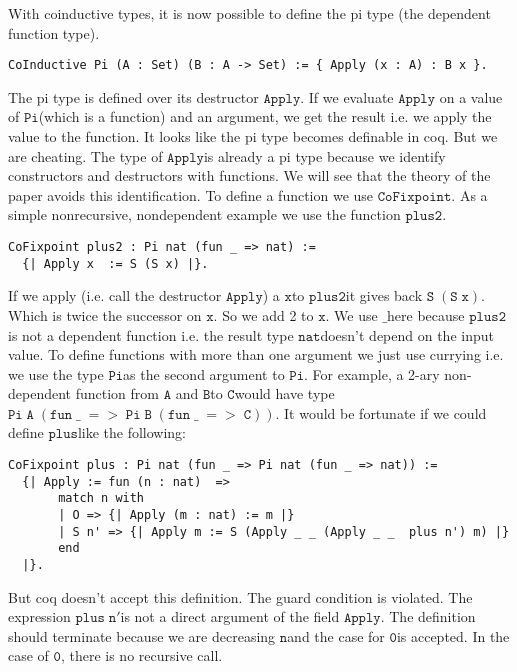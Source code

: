 \documentclass[a4paper,cleardoubleempty,BCOR1cm]{scrbook}
\begin{document}
With coinductive types, it is now possible to define the pi type (the dependent
function type).

\begin{verbatim}
CoInductive Pi (A : Set) (B : A -> Set) := { Apply (x : A) : B x }.
\end{verbatim}

The pi type is defined over its destructor $\mathtt{Apply}$.  If we evaluate $\mathtt{Apply}$
on a value of $\mathtt{Pi}$\;(which is a function) and an argument, we get the result
i.e. we apply the value to the function.  It looks like the pi type becomes definable
in coq.  But we are cheating.  The type of $\mathtt{Apply}$\;is already a pi type because
we identify constructors and destructors with functions.  We will see that the theory of
the paper avoids this identification. To define a function we use
$\mathtt{CoFixpoint}$.  As a simple nonrecursive, nondependent example we use the
function $\mathtt{plus2}$.

\begin{verbatim}
CoFixpoint plus2 : Pi nat (fun _ => nat) :=
  {| Apply x  := S (S x) |}.
\end{verbatim}

If we apply (i.e. call the destructor $\mathtt{Apply}$) a $\mathtt{x}$\;to $\mathtt{plus2}$\;it gives back
$\mathtt{S\;(S\;x)}$.  Which is twice the successor on $\mathtt{x}$.  So we add 2 to $\mathtt{x}$.  We
use $\mathtt{\_}$\;here because $\mathtt{plus2}$\;is not a dependent function i.e. the result
type $\mathtt{nat}$\;doesn't depend on the input value.  To define functions with more
than one argument we just use currying i.e. we use the type $\mathtt{Pi}$\;as the
second argument to $\mathtt{Pi}$. For example, a 2-ary non-dependent function from $\mathtt{A}$
and $\mathtt{B}$\;to $\mathtt{C}$\;would have type $\mathtt{Pi\;A\;(fun\;\_\;=>\;Pi\;B\;(fun\;\_\;=>\;C))}$.  It
would be fortunate if we could define $\mathtt{plus}$\;like the following:

\begin{verbatim}
CoFixpoint plus : Pi nat (fun _ => Pi nat (fun _ => nat)) :=
  {| Apply := fun (n : nat)  =>
       match n with
       | O => {| Apply (m : nat) := m |}
       | S n' => {| Apply m := S (Apply _ _ (Apply _ _  plus n') m) |}
       end
  |}.
\end{verbatim}

But coq doesn't accept this definition. The guard condition is violated. The
expression $\mathtt{plus\;n'}$\;is not a direct argument of the field $\mathtt{Apply}$. The
definition should terminate because we are decreasing $\mathtt{n}$\;and the case for
$\mathtt{0}$\;is accepted. In the case of $\mathtt{0}$, there is no recursive call.
\end{document}
